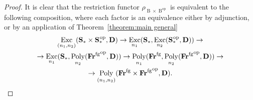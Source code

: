 \documentclass[psamsfonts]{amsart}
\theoremstyle{plain}
\theoremstyle{definition}
\theoremstyle{remark}
\newcommand{\catname}[1]{{\normalfont\textbf{#1}}}
\newcommand{\op}{{\mathrm{op}}}
\newcommand{\spaces}{\catname{S}_*}
\newcommand{\fr}{\allfr^{\mathrm{fg}}}
\newcommand{\allfr}{\catname{Fr}}
\newcommand{\classifying}{\operatorname{B}}
\DeclareMathOperator{\poly}{Poly}
\DeclareMathOperator{\exc}{Exc}
\begin{document}
\begin{proof}
It is clear that the restriction functor $\rho_{\classifying\times {\classifying}^{\op}}$ is equivalent to the following composition, where each factor is an equivalence either by adjunction, or by an application of Theorem~\ref{theorem:main general}
\begin{multline*}
\exc_{(n_1, n_2)}(\spaces\times {\spaces}^{\!\!\!\op}, \catname{D}) \to \exc_{n_1}(\spaces, \exc_{n_2}({\spaces}^{\!\!\!\op}, \catname{D}))\to \\ \to \exc_{n_1}(\spaces, \poly_{n_2}({\fr}^{\op}, \catname{D}))\to \poly_{n_1}(\fr, \poly_{n_2}({\fr}^{\op}, \catname{D}))\to \\ \to \poly_{(n_1, n_2)}(\fr\times {\fr}^{\op}, \catname{D}).
\end{multline*}
\end{proof}
\end{document}

